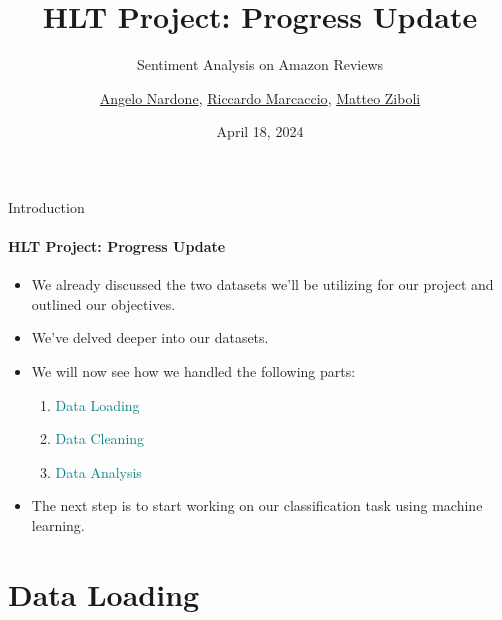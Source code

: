 \documentclass{beamer}
\title{HLT Project: Progress Update}
\subtitle{Sentiment Analysis on Amazon Reviews}
\author{\href{mailto:a.nardone5@studenti.unipi.it}{Angelo Nardone}, \href{mailto:r.marcaccio@studenti.unipi.it}{Riccardo Marcaccio}, \href{mailto: m.ziboli@studenti.unipi.it}{Matteo Ziboli}}
\date{April 18, 2024}
\theoremstyle{definition}
\theoremstyle{plain}
\begin{document}
\maketitle


\begin{frame}{Introduction}
\framesubtitle{HLT Project: Progress Update}
{\small 
\begin{itemize}

    \item We already discussed the two datasets we'll be utilizing for our project and outlined our objectives. 

    \item We've delved deeper into our datasets. 

    \item We will now see how we handled the following parts:
    \begin{enumerate}
        \item \textcolor{teal}{Data Loading}
        \item \textcolor{teal}{Data Cleaning}
        \item \textcolor{teal}{Data Analysis}
    \end{enumerate}

    \item The next step is to start working on our classification task using machine learning.
\end{itemize}
}
\end{frame}


\section{Data Loading}
\end{document}
